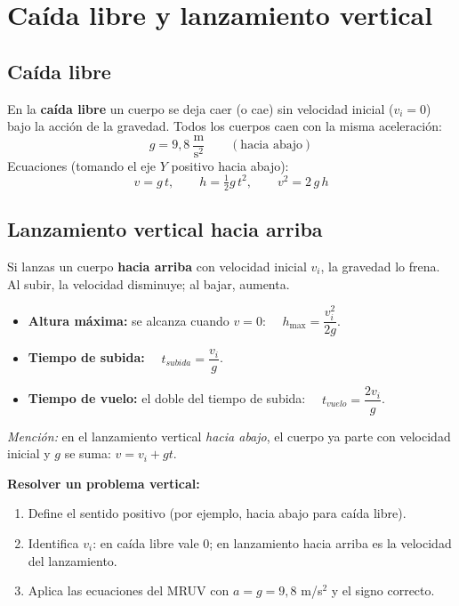 \documentclass[12pt, letterpaper]{article}
\begin{document}
\section{Caída libre y lanzamiento vertical}

\subsection{Caída libre}

\begin{cuadroteoria}
  En la \textbf{caída libre} un cuerpo se deja caer (o cae) sin velocidad inicial ($v_i = 0$) bajo la acción de la gravedad. Todos los cuerpos caen con la misma aceleración:
  $$g = 9{,}8 \ \frac{\text{m}}{\text{s}^2} \qquad (\text{hacia abajo})$$
  Ecuaciones (tomando el eje $Y$ positivo hacia abajo):
  $$v = g\, t, \qquad h = \tfrac{1}{2} g\, t^2, \qquad v^2 = 2\, g\, h$$
\end{cuadroteoria}

\subsection{Lanzamiento vertical hacia arriba}

\begin{cuadroteoria}
  Si lanzas un cuerpo \textbf{hacia arriba} con velocidad inicial $v_i$, la gravedad lo frena. Al subir, la velocidad disminuye; al bajar, aumenta.
  \begin{itemize}[leftmargin=*]
    \item \textbf{Altura máxima:} se alcanza cuando $v = 0$: $\quad h_{\max} = \dfrac{v_i^2}{2g}$.
    \item \textbf{Tiempo de subida:} $\quad t_{subida} = \dfrac{v_i}{g}$.
    \item \textbf{Tiempo de vuelo:} el doble del tiempo de subida: $\quad t_{vuelo} = \dfrac{2 v_i}{g}$.
  \end{itemize}
  \emph{Mención:} en el lanzamiento vertical \emph{hacia abajo}, el cuerpo ya parte con velocidad inicial y $g$ se suma: $v = v_i + g t$.
\end{cuadroteoria}

\begin{cuadropasos}
  \textbf{Resolver un problema vertical:}
  \begin{enumerate}[leftmargin=*]
    \item Define el sentido positivo (por ejemplo, hacia abajo para caída libre).
    \item Identifica $v_i$: en caída libre vale $0$; en lanzamiento hacia arriba es la velocidad del lanzamiento.
    \item Aplica las ecuaciones del MRUV con $a = g = 9{,}8$ m/s$^2$ y el signo correcto.
  \end{enumerate}
\end{cuadropasos}
\end{document}
